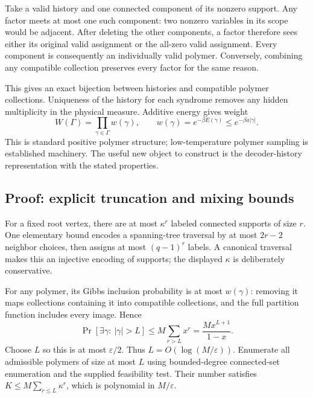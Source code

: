 \documentclass[11pt,a4paper]{article}
\begin{document}
Take a valid history and one connected component of its nonzero support. Any factor meets at most one such component: two nonzero variables in its scope would be adjacent. After deleting the other components, a factor therefore sees either its original valid assignment or the all-zero valid assignment. Every component is consequently an individually valid polymer. Conversely, combining any compatible collection preserves every factor for the same reason.

This gives an exact bijection between histories and compatible polymer collections. Uniqueness of the history for each syndrome removes any hidden multiplicity in the physical measure. Additive energy gives weight
\begin{equation}
 W(\Gamma)=\prod_{\gamma\in\Gamma}w(\gamma),\qquad
 w(\gamma)=e^{-\beta E(\gamma)}\leq e^{-\beta a|\gamma|}.
\end{equation}
This is standard positive polymer structure; low-temperature polymer sampling is established machinery.\cite{cgpsv,hpr} The useful new object to construct is the decoder-history representation with the stated properties.

\subsection{Proof: explicit truncation and mixing bounds}

For a fixed root vertex, there are at most $\kappa^r$ labeled connected supports of size $r$. One elementary bound encodes a spanning-tree traversal by at most $2r-2$ neighbor choices, then assigns at most $(q-1)^r$ labels. A canonical traversal makes this an injective encoding of supports; the displayed $\kappa$ is deliberately conservative.

For any polymer, its Gibbs inclusion probability is at most $w(\gamma)$: removing it maps collections containing it into compatible collections, and the full partition function includes every image. Hence
\begin{equation}\label{eq:tail}
 \Pr[\exists\gamma:\ |\gamma|>L]
 \leq M\sum_{r>L}x^r=\frac{Mx^{L+1}}{1-x}.
\end{equation}
Choose $L$ so this is at most $\varepsilon/2$. Thus $L=O(\log(M/\varepsilon))$. Enumerate all admissible polymers of size at most $L$ using bounded-degree connected-set enumeration and the supplied feasibility test. Their number satisfies $K\leq M\sum_{r\leq L}\kappa^r$, which is polynomial in $M/\varepsilon$.
\end{document}
